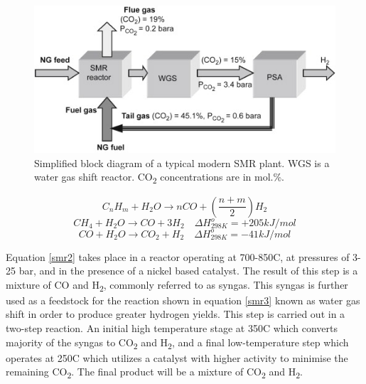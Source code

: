 \begin{figure}
    \centering
    \includegraphics{figures/smrprocess.jpg}
    \caption{Simplified block diagram of a typical modern SMR plant. WGS is a water gas shift reactor. CO\textsubscript{2} concentrations are in mol.\%. \cite{Muradov2015}}
    \label{fig:smrprocess}
\end{figure}

\begin{equation} \label{smr1}
    C_n H_m + H_2 O \rightarrow nCO +(\frac{n+m}{2})H_2 
\end{equation}
\begin{equation}\label{smr2}
    CH_4 + H_2 O \rightarrow CO + 3H_2 \quad \Delta H_{298K}^o = +205 kJ/mol
\end{equation}
\begin{equation}\label{smr3}
    CO+ H_2 O \rightarrow CO_2 + H_2 \quad \Delta H_{298K}^o = -41 kJ/mol
\end{equation}

Equation \ref{smr2} takes place in a reactor operating at 700-850\textdegree C, at pressures of 3-25 bar, and in the presence of a nickel based catalyst. \cite{Muradov2015}
The result of this step is a mixture of CO and H\textsubscript{2}, commonly referred to as syngas. 
This syngas is further used as a feedstock for the reaction shown in equation \ref{smr3} known as water gas 
shift in order to produce greater hydrogen yields.  
This step is carried out in a two-step reaction. An initial high temperature stage at 350\textdegree C which converts majority of the syngas to CO\textsubscript{2} and H\textsubscript{2}, and a final low-temperature step which operates at 250\textdegree C which utilizes a catalyst with higher activity to minimise the remaining CO\textsubscript{2}. \cite{Muradov2015}
The final product will be a mixture of CO\textsubscript{2} and H\textsubscript{2}.  

